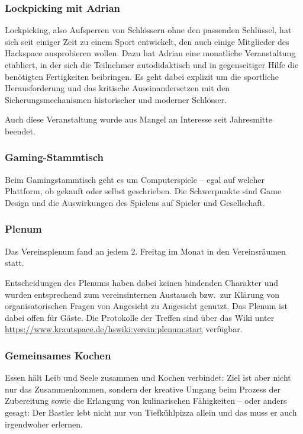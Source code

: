 \documentclass[ngerman,10pt,DIV16]{scrartcl}
\begin{document}
\subsubsection{Lockpicking mit Adrian}

Lockpicking, also Aufsperren von Schlössern ohne den passenden
Schlüssel, hat sich seit einiger Zeit zu einem Sport entwickelt, den
auch einige Mitglieder des Hackspace ausprobieren wollen. Dazu hat
Adrian eine monatliche Veranstaltung etabliert, in der sich die Teilnehmer
autodidaktisch und in gegenseitiger Hilfe die benötigten Fertigkeiten
beibringen. Es geht dabei explizit um die sportliche Herausforderung
und das kritische Auseinandersetzen mit den Sicherungsmechanismen
historischer und moderner Schlösser.

Auch diese Veranstaltung wurde aus Mangel an Interesse seit Jahresmitte beendet. 

\subsubsection{Gaming-Stammtisch}

Beim Gamingstammtisch geht es um Computerspiele – egal auf welcher Plattform, ob gekauft oder selbst geschrieben.
Die Schwerpunkte sind Game Design und die Auswirkungen des Spielens auf Spieler und Gesellschaft. 

\subsubsection{Plenum}

Das Vereinsplenum fand an jedem 2. Freitag im Monat in den
Vereinsräumen statt.

Entscheidungen des Plenums haben dabei keinen bindenden Charakter und
wurden entsprechend zum vereinsinternen Austausch bzw.\ zur Klärung von
organisatorischen Fragen von Angesicht zu Angesicht genutzt. Das Plenum ist dabei offen für Gäste.
Die Protokolle der Treffen sind über das Wiki unter
\url{https://www.krautspace.de/hswiki:verein:plenum:start} verfügbar.

\subsubsection{Gemeinsames Kochen}

Essen hält Leib und Seele zusammen und Kochen verbindet:
Ziel ist aber nicht nur das Zusammenkommen, sondern der kreative Umgang
beim Prozess der Zubereitung sowie die Erlangung von kulinarischen
Fähigkeiten -- oder anders gesagt: Der Bastler lebt nicht nur von
Tiefkühlpizza allein und das muss er auch irgendwoher erlernen.
\end{document}
